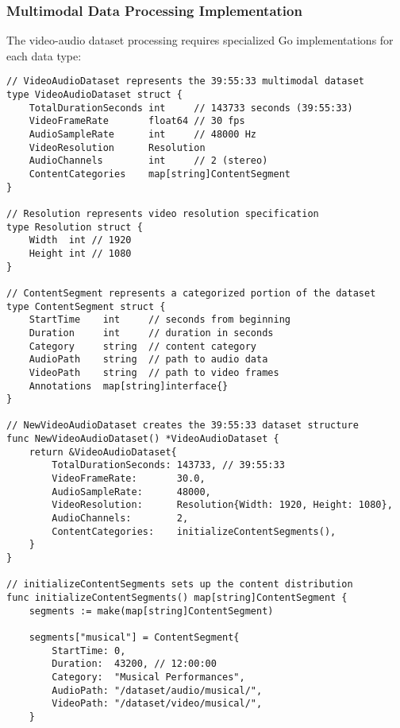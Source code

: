 \subsubsection{Multimodal Data Processing Implementation}

The video-audio dataset processing requires specialized Go implementations for each data type:

\begin{tcolorbox}[colback=CodeBackground, colframe=DarkGray, title=Video-Audio Dataset Processing, fonttitle=\bfseries]
\begin{verbatim}
// VideoAudioDataset represents the 39:55:33 multimodal dataset
type VideoAudioDataset struct {
    TotalDurationSeconds int     // 143733 seconds (39:55:33)
    VideoFrameRate       float64 // 30 fps
    AudioSampleRate      int     // 48000 Hz
    VideoResolution      Resolution
    AudioChannels        int     // 2 (stereo)
    ContentCategories    map[string]ContentSegment
}

// Resolution represents video resolution specification
type Resolution struct {
    Width  int // 1920
    Height int // 1080
}

// ContentSegment represents a categorized portion of the dataset
type ContentSegment struct {
    StartTime    int     // seconds from beginning
    Duration     int     // duration in seconds
    Category     string  // content category
    AudioPath    string  // path to audio data
    VideoPath    string  // path to video frames
    Annotations  map[string]interface{}
}

// NewVideoAudioDataset creates the 39:55:33 dataset structure
func NewVideoAudioDataset() *VideoAudioDataset {
    return &VideoAudioDataset{
        TotalDurationSeconds: 143733, // 39:55:33
        VideoFrameRate:       30.0,
        AudioSampleRate:      48000,
        VideoResolution:      Resolution{Width: 1920, Height: 1080},
        AudioChannels:        2,
        ContentCategories:    initializeContentSegments(),
    }
}

// initializeContentSegments sets up the content distribution
func initializeContentSegments() map[string]ContentSegment {
    segments := make(map[string]ContentSegment)
    
    segments["musical"] = ContentSegment{
        StartTime: 0,
        Duration:  43200, // 12:00:00
        Category:  "Musical Performances",
        AudioPath: "/dataset/audio/musical/",
        VideoPath: "/dataset/video/musical/",
    }
    

\end{verbatim}
\end{tcolorbox}
